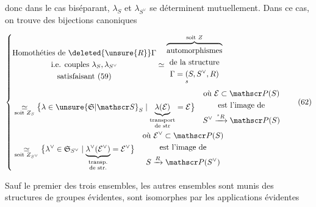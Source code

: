 
donc dans le cas biséparant, $\lambda_S$ et $\lambda_{S^\vee}$ se déterminent mutuellement. Dans ce cas, on trouve des bijections canoniques

\[
\left\{\begin{aligned}
&\begin{gathered}\text{Homothéties de }\deleted{\unsure{R}}\Gamma\\
\text{i.e. couples }\lambda_S,\lambda_{S^\vee}\\\text{satisfaisant (59)}\end{gathered}
\simeq\overbrace{\begin{gathered}\text{automorphismes}\\\text{de la structure}\\
\Gamma=\underset{s}{(}S,S^\vee,R)\end{gathered}}^{\text{soit }Z}\\[3pt]
&\underset{\text{soit }Z_S}{\simeq}
\bigl\{\lambda\in\unsure{\mathfrak S|\mathscr S}_S\mid
\underbrace{\lambda(\mathcal E)}_{\substack{\text{transport}\\\text{de str}}}=\mathcal E\bigr\}
\quad\begin{gathered}\text{où }\mathcal E\subset\mathscr P(S)\\ \text{est l'image de}\\ S^\vee\xrightarrow{{}^sR}\mathscr P(S)\end{gathered}\\
&\underset{\text{soit }Z_{S^\vee}}{\simeq}
\bigl\{\lambda^\vee\in\mathfrak S_{S^\vee}\mid
\underbrace{\lambda^\vee(\mathcal E^\vee)}_{\substack{\text{transp.}\\\text{de str.}}}=\mathcal E^\vee\bigr\}
\quad\begin{gathered}\text{où }\mathcal E^\vee\subset\mathscr P(S)\\ \text{est l'image de}\\S\xrightarrow R\mathscr P(S^\vee)\end{gathered}
\end{aligned}\right. \tag*{(62)}
\]

Sauf le premier des trois  ensembles, les autres ensembles sont munis des structures de groupes évidentes,  sont isomorphes par les applications évidentes


